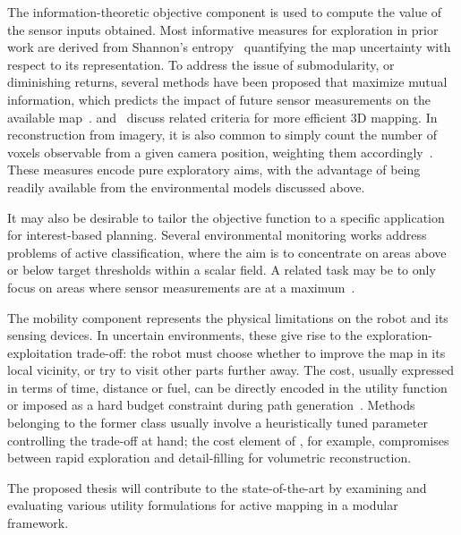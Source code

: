The information-theoretic objective component is used to compute the value of the sensor inputs 
obtained. Most informative measures for exploration in prior work are derived from Shannon's 
entropy~\cite{Cover2006, Lim2015, Bourgault2002, Yang2014} quantifying the map uncertainty with respect to 
its representation. To address the issue of submodularity, or diminishing returns, several methods have been 
proposed that maximize mutual information, which predicts the impact of future sensor measurements on the 
available map~\cite{Hitz2015, Hollinger2014, Krause2008}. \citet{Charrow2015a} and~\citet{Carrillo2015a} 
discuss related criteria for more efficient 3D mapping. In reconstruction from imagery, it is also common to 
simply count the number of voxels observable from a given camera position, weighting them 
accordingly~\cite{Bircher2016, Isler2016, Heng2015}. These measures encode pure exploratory aims, with the 
advantage of being readily available from the environmental models discussed above.

It may also be desirable to tailor the objective function to a specific application for interest-based 
planning. Several environmental monitoring works \cite{Gotovos2013, Hitz2014, Vivaldini2016} address 
problems of active classification, where the aim is to concentrate on areas above or below target thresholds 
within a scalar field. A related task may be to only focus on areas where sensor measurements are at a 
maximum~\cite{Marchant2014}.

The mobility component represents the physical limitations on the robot and its sensing devices. In uncertain 
environments, these give rise to the exploration-exploitation trade-off: the 
robot must choose whether to improve the map in its local vicinity, or try to visit other parts further away. 
The cost, usually expressed in terms of time, distance or fuel, can be directly encoded in the utility 
function~\cite{Charrow2015a, Bircher2016, Heng2015} or imposed as a hard budget constraint during path 
generation~\cite{Hitz2015, Binney2013}. Methods belonging to the former class usually involve a heuristically 
tuned parameter controlling the trade-off at hand; the cost element of \citet{Heng2015}, for example, 
compromises between rapid exploration and detail-filling for volumetric reconstruction.

The proposed thesis will contribute to the state-of-the-art by examining and evaluating various 
utility formulations for active mapping in a modular framework.

